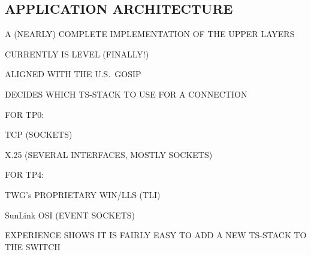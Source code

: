\begin{bwslide}
\part*	{APPLICATION ARCHITECTURE}\bf

\begin{nrtc}
\item	A (NEARLY) COMPLETE IMPLEMENTATION OF THE UPPER LAYERS

\item	CURRENTLY IS LEVEL (FINALLY!)

\item	ALIGNED WITH THE U.S.~GOSIP
\end{nrtc}
\end{bwslide}






\begin{bwslide}

\begin{nrtc}
\item	DECIDES WHICH TS-STACK TO USE FOR A CONNECTION

\item	FOR TP0:
    \begin{nrtc}
    \item	TCP (SOCKETS)

    \item	X.25 (SEVERAL INTERFACES, MOSTLY SOCKETS)
    \end{nrtc}

\item	FOR TP4:
    \begin{nrtc}
    \item	TWG's PROPRIETARY WIN/LLS (TLI)

    \item	SunLink OSI (EVENT SOCKETS)
    \end{nrtc}

\item	EXPERIENCE SHOWS IT IS FAIRLY EASY TO ADD A NEW TS-STACK TO THE SWITCH
\end{nrtc}
\end{bwslide}


